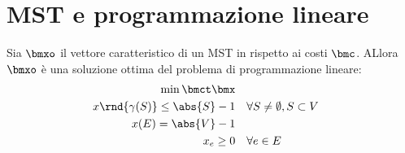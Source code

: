 \documentclass[\main/main.tex]{subfiles}
\begin{document}
\section{MST e programmazione lineare}
\begin{theorem}
  Sia \(\bmxo\) il vettore caratteristico di un MST in rispetto ai costi \(\bmc \). ALlora \(\bmxo\) è una soluzione ottima del problema di programmazione lineare:
  \begin{align*}
    \min \bmct\bmx                                                                 \\
    x\rnd{\gamma(S)} \leq \abs{S} -1 & \quad \forall S \neq \emptyset, S \subset V \\
    x(E) = \abs{V} -1                                                              \\
    x_e \geq 0                       & \quad \forall e \in E
  \end{align*}
\end{theorem}
\end{document}
